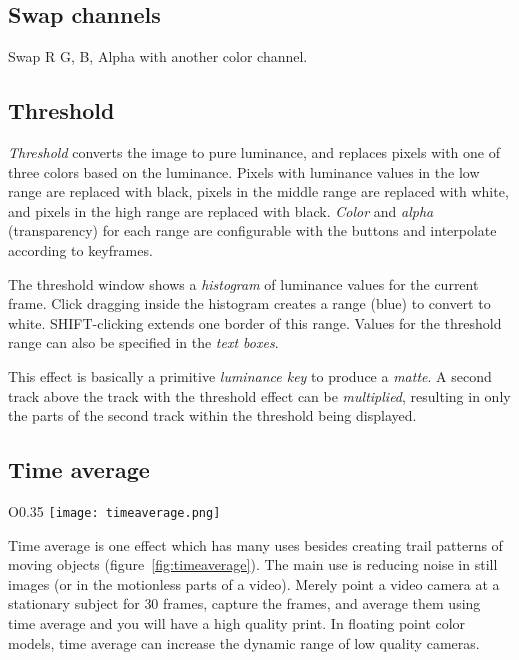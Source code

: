 \subsection{Swap channels}%
\label{sub:swap_channels}

Swap R G, B, Alpha with another color channel.

\subsection{Threshold}%
\label{sub:threshold}

\textit{Threshold} converts the image to pure luminance, and replaces pixels with one of three colors based on the luminance. Pixels with luminance values in the low range are replaced with black, pixels in the middle range are replaced with white, and pixels in the high range are replaced with black. \textit{Color} and \textit{alpha} (transparency) for each range are configurable with the buttons and interpolate according to keyframes.

The threshold window shows a \textit{histogram} of luminance values for the current frame. Click dragging inside the histogram creates a range (blue) to convert to white. SHIFT-clicking extends one border of this range. Values for the threshold range can also be specified in the \textit{text boxes}.

This effect is basically a primitive \textit{luminance key} to produce a \textit{matte}. A second track above the track with the threshold effect can be \textit{multiplied}, resulting in only the parts of the second track within the threshold being displayed.

\subsection{Time average}%
\label{sub:time_average}

\begin{wrapfigure}[18]{O}{0.35\linewidth}
	\vspace{-2ex}
	\texttt{[image: timeaverage.png]}
	\caption{GUI for Time Average}
	\label{fig:timeaverage}
\end{wrapfigure}

Time average is one effect which has many uses besides creating trail patterns of moving objects (figure~\ref{fig:timeaverage}).
The main use is reducing noise in still images (or in the motionless parts of a video). Merely point a video camera at a stationary subject for $30$ frames, capture the frames, and average them using time average and you will have a high quality print. In floating point color models, time average can increase the dynamic range of low quality cameras.

